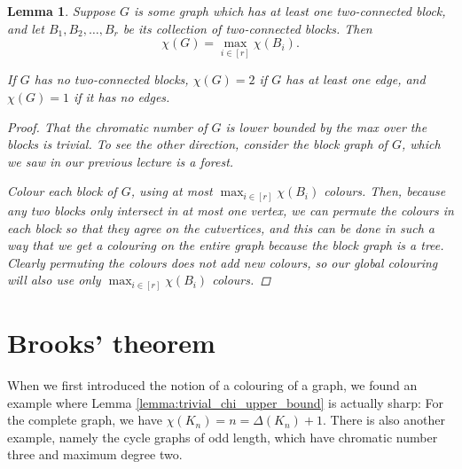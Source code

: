 \documentclass[nobib]{tufte-handout}
\newtheorem{lemma}{Lemma}
\newtheorem{xca}{Exercise}
\begin{document}
\begin{lemma}\label{lemma:chi_max_over_biconnecteds}
  Suppose $G$ is some graph which has at least one two-connected block, and let $B_1, B_2, \ldots, B_r$ be its collection of two-connected blocks. Then
  $$\chi(G) = \max_{i\in[r]} \chi(B_i).$$

  If $G$ has no two-connected blocks, $\chi(G) = 2$ if $G$ has at least one edge, and $\chi(G) = 1$ if it has no edges.

  \begin{proof}
    That the chromatic number of $G$ is lower bounded by the max over the blocks is trivial. To see the other direction, consider the block graph of $G$, which we saw in our previous lecture is a forest.

    Colour each block of $G$, using at most $\max_{i\in[r]} \chi(B_i)$ colours. Then, because any two blocks only intersect in at most one vertex, we can permute the colours in each block so that they agree on the cutvertices, and this can be done in such a way that we get a colouring on the entire graph because the block graph is a tree. 
    Clearly permuting the colours does not add new colours, so our global colouring will also use only $\max_{i\in[r]} \chi(B_i)$ colours.
  \end{proof}
\end{lemma}


\section{Brooks' theorem}

When we first introduced the notion of a colouring of a graph, we found an example where Lemma \ref{lemma:trivial_chi_upper_bound} is actually sharp: For the complete graph, we have $\chi(K_n) = n = \Delta(K_n) + 1$. There is also another example, namely the cycle graphs of odd length, which have chromatic number three and maximum degree two.
\end{document}
